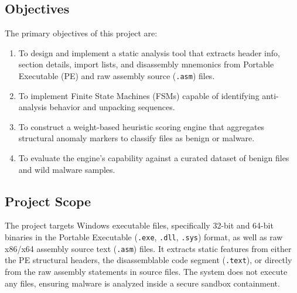\documentclass[11pt,a4paper]{article}
\begin{document}
\subsection{Objectives}
The primary objectives of this project are:
\begin{enumerate}
    \item To design and implement a static analysis tool that extracts header info, section details, import lists, and disassembly mnemonics from Portable Executable (PE) and raw assembly source (\texttt{.asm}) files.
    \item To implement Finite State Machines (FSMs) capable of identifying anti-analysis behavior and unpacking sequences.
    \item To construct a weight-based heuristic scoring engine that aggregates structural anomaly markers to classify files as benign or malware.
    \item To evaluate the engine's capability against a curated dataset of benign files and wild malware samples.
\end{enumerate}

\subsection{Project Scope}
The project targets Windows executable files, specifically 32-bit and 64-bit binaries in the Portable Executable (\texttt{.exe}, \texttt{.dll}, \texttt{.sys}) format, as well as raw x86/x64 assembly source text (\texttt{.asm}) files. It extracts static features from either the PE structural headers, the disassemblable code segment (\texttt{.text}), or directly from the raw assembly statements in source files. The system does not execute any files, ensuring malware is analyzed inside a secure sandbox containment.
\end{document}
